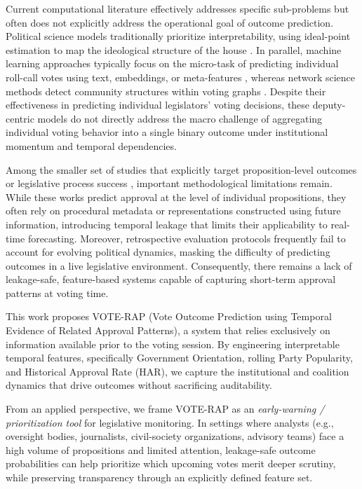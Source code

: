 \documentclass[review]{elsarticle}
\begin{document}
Current computational literature effectively addresses specific sub-problems but often does not explicitly address the operational goal of outcome prediction. Political science models traditionally prioritize interpretability, using ideal-point estimation to map the ideological structure of the house \citep{Poole1985,Clinton2004}. In parallel, machine learning approaches typically focus on the micro-task of predicting individual roll-call votes using text, embeddings, or meta-features \citep{Kraft2021,Feng2022PAR,Patil2020,Viola2022DataCentricBrazil,Albuquerque2025Forecasting}, whereas network science methods detect community structures within voting graphs \citep{Ferreira2021,Cherepnalkoski2022}. Despite their effectiveness in predicting individual legislators' voting decisions, these deputy-centric models do not directly address the macro challenge of aggregating individual voting behavior into a single binary outcome under institutional momentum and temporal dependencies.

Among the smaller set of studies that explicitly target proposition-level outcomes or legislative process success \citep{Bari2021AIBillPassageUS}, important methodological limitations remain. While these works predict approval at the level of individual propositions, they often rely on procedural metadata or representations constructed using future information, introducing temporal leakage that limits their applicability to real-time forecasting. Moreover, retrospective evaluation protocols frequently fail to account for evolving political dynamics, masking the difficulty of predicting outcomes in a live legislative environment. Consequently, there remains a lack of leakage-safe, feature-based systems capable of capturing short-term approval patterns at voting time.

This work proposes VOTE-RAP (Vote Outcome Prediction using Temporal Evidence of Related Approval Patterns), a system that relies exclusively on information available prior to the voting session. By engineering interpretable temporal features, specifically Government Orientation, rolling Party Popularity, and Historical Approval Rate (HAR), we capture the institutional and coalition dynamics that drive outcomes without sacrificing auditability.

\par
From an applied perspective, we frame VOTE-RAP as an \emph{early-warning / prioritization tool} for legislative monitoring. In settings where analysts (e.g., oversight bodies, journalists, civil-society organizations, advisory teams) face a high volume of propositions and limited attention, leakage-safe outcome probabilities can help prioritize which upcoming votes merit deeper scrutiny, while preserving transparency through an explicitly defined feature set.
\end{document}
